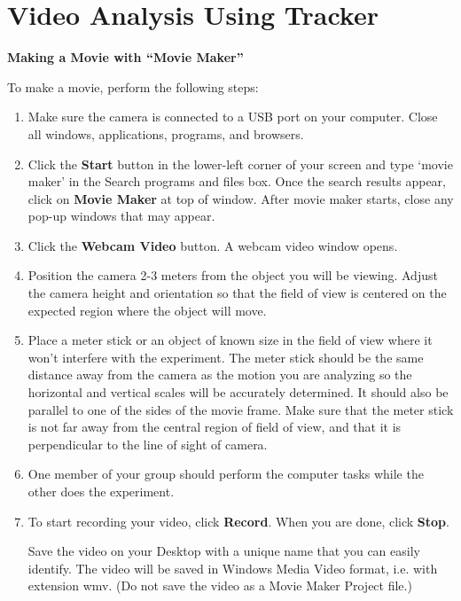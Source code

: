 
\section{Video Analysis Using Tracker}
\label{tracker}
\textbf{Making a Movie with ``Movie Maker''} 

To make a movie, perform the following steps:

\begin{enumerate}

\item Make sure the camera is connected to a USB port on your computer. 
Close all windows, applications, programs, and browsers.

\item Click the {\bf Start} button in the lower-left corner of your screen and 
type `movie maker' in the Search programs and files box. 
Once the search results appear, click on {\bf Movie Maker} at top of window.
After movie maker starts, close any pop-up windows that may appear.

\item Click the {\bf Webcam Video} button. 
A webcam video window opens. 

\item Position the camera 2-3 meters from the object you will be viewing. 
Adjust the camera height and orientation so that the field of view is 
centered on the expected region where the object will move. 

\item Place a meter stick or an object of known size in the field of view where 
it won't interfere with the experiment. 
The meter stick should be the same distance away from the camera as the motion 
you are analyzing so the horizontal and vertical scales will be accurately determined. 
It should also be parallel to one of the sides of the movie frame. 
Make sure that the meter stick is not far away from the central region of field of view, and that it is perpendicular to the line of sight of camera.

\item One member of your group should perform the computer tasks while the other does the experiment.

\item To start recording your video, click {\bf Record}. When you are done, click {\bf Stop}. 

Save the video on your Desktop with a unique name that you can easily identify.
 The video will be saved in Windows Media Video format, i.e. with extension wmv. (Do not save the video as a Movie Maker Project file.)

\end{enumerate}

